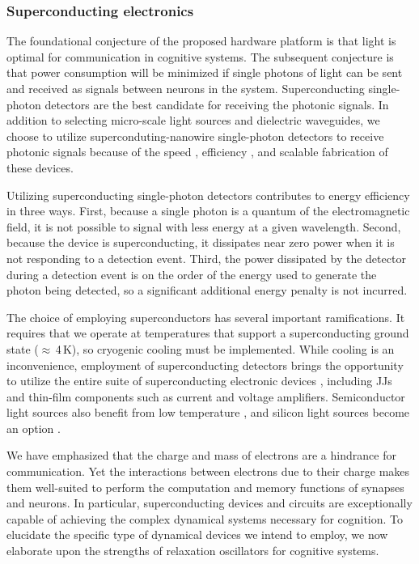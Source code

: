 \documentclass[aip,amsmath,amssymb,reprint,nofootinbib]{revtex4-1}
\begin{document}
\subsubsection{Superconducting electronics}
The foundational conjecture of the proposed hardware platform is that light is optimal for communication in cognitive systems. The subsequent conjecture is that power consumption will be minimized if single photons of light can be sent and received as signals between neurons in the system. Superconducting single-photon detectors are the best candidate for receiving the photonic signals. In addition to selecting micro-scale light sources and dielectric waveguides, we choose to utilize superconduting-nanowire single-photon detectors \cite{gook2001,nata2012,liyo2013,mave2013} to receive photonic signals because of the speed \cite{yake2007}, efficiency \cite{mave2013}, and scalable fabrication \cite{buch2017} of these devices. 

Utilizing superconducting single-photon detectors contributes to energy efficiency in three ways. First, because a single photon is a quantum of the electromagnetic field, it is not possible to signal with less energy at a given wavelength. Second, because the device is superconducting, it dissipates near zero power when it is not responding to a detection event. Third, the power dissipated by the detector during a detection event is on the order of the energy used to generate the photon being detected, so a significant additional energy penalty is not incurred.

The choice of employing superconductors has several important ramifications. It requires that we operate at temperatures that support a superconducting ground state ($\approx$\,4\,K), so cryogenic cooling must be implemented. While cooling is an inconvenience, employment of superconducting detectors brings the opportunity to utilize the entire suite of superconducting electronic devices \cite{ti1996,vatu1998,ka1999}, including JJs and thin-film components such as current \cite{mcbe2014,mcab2016} and voltage \cite{zhto2018} amplifiers. Semiconductor light sources also benefit from low temperature \cite{doro2017}, and silicon light sources become an option \cite{buch2017}. 

We have emphasized that the charge and mass of electrons are a hindrance for communication. Yet the interactions between electrons due to their charge makes them well-suited to perform the computation and memory functions of synapses and neurons. In particular, superconducting devices and circuits are exceptionally capable of achieving the complex dynamical systems necessary for cognition. To elucidate the specific type of dynamical devices we intend to employ, we now elaborate upon the strengths of relaxation oscillators for cognitive systems.
\end{document}
